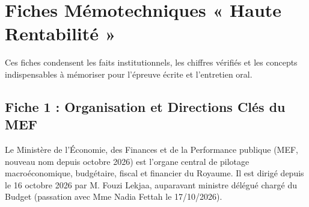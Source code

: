 \chapter{Fiches Mémotechniques « Haute Rentabilité »}

Ces fiches condensent les faits institutionnels, les chiffres vérifiés et les concepts indispensables à mémoriser pour l'épreuve écrite et l'entretien oral.

\section{Fiche 1 : Organisation et Directions Clés du MEF}

Le Ministère de l'Économie, des Finances et de la Performance publique (MEF, nouveau nom depuis octobre 2026) est l'organe central de pilotage macroéconomique, budgétaire, fiscal et financier du Royaume. Il est dirigé depuis le 16 octobre 2026 par M. Fouzi Lekjaa, auparavant ministre délégué chargé du Budget (passation avec Mme Nadia Fettah le 17/10/2026).

